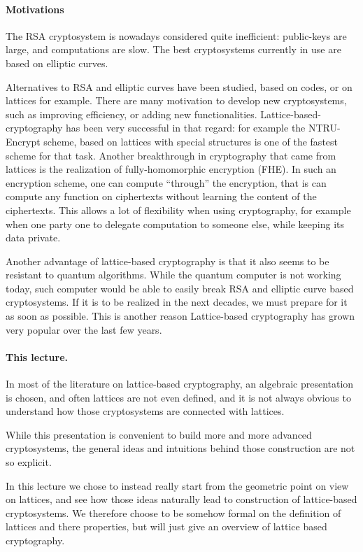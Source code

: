 \documentclass[12pt]{article}
\begin{document}
\paragraph{Motivations}

The RSA cryptosystem is nowadays considered quite inefficient: public-keys are large, and computations are slow. The best cryptosystems currently in use are based on elliptic curves.

Alternatives to RSA and elliptic curves have been studied, based on codes, or on lattices for example. There are many motivation to develop new cryptosystems, such as improving efficiency, or adding new functionalities. Lattice-based-cryptography has been very successful in that regard: for example the NTRU-Encrypt scheme, based on lattices with special structures is one of the fastest scheme for that task. Another breakthrough in cryptography that came from lattices is the realization of fully-homomorphic encryption (FHE). In such an encryption scheme, one can compute ``through'' the encryption, that is can compute any function on ciphertexts without learning the content of the ciphertexts. This allows a lot of flexibility when using cryptography, for example when one party one to delegate computation to someone else, while keeping its data private.

Another advantage of lattice-based cryptography is that it also seems to be resistant to quantum algorithms. While the quantum computer is not working today, such computer would be able to easily break RSA and elliptic curve based cryptosystems. If it is to be realized in the next decades, we must prepare for it as soon as possible. This is another reason Lattice-based cryptography has grown very popular over the last few years.

\paragraph{This lecture.}

In most of the literature on lattice-based cryptography, an algebraic presentation is chosen, and often lattices are not even defined, and it is not always obvious to understand how those cryptosystems are connected with lattices. 

While this presentation is convenient to build more and more advanced cryptosystems, the general ideas and intuitions behind those construction are not so explicit. 

In this lecture we chose to instead really start from the geometric point on view on lattices, and see how those ideas naturally lead to construction of lattice-based cryptosystems. We therefore choose to be somehow formal on the definition of lattices and there properties, but will just give an overview of lattice based cryptography.
\end{document}

